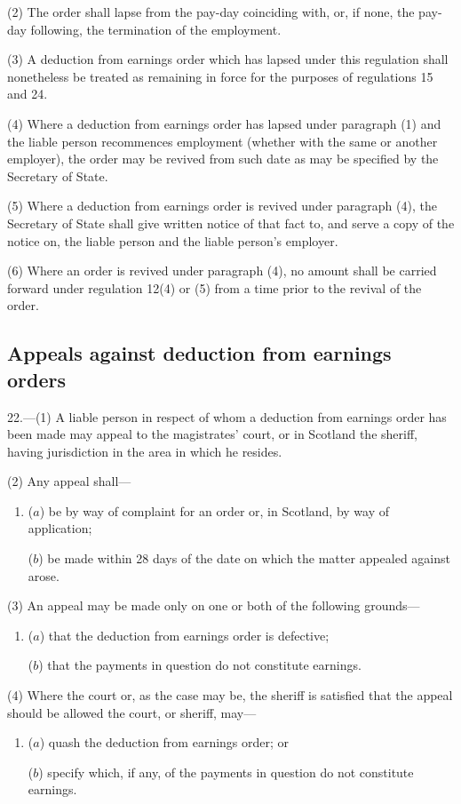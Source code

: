 \documentclass[a4paper]{article}
\begin{document}
(2) The order shall lapse from the pay-day coinciding with, or, if none, the pay-day following, the termination of the employment.

(3) A deduction from earnings order which has lapsed under this regulation shall nonetheless be treated as remaining in force for the purposes of regulations 15 and 24.

(4) Where a deduction from earnings order has lapsed under paragraph (1) and the liable person recommences employment (whether with the same or another employer), the order may be revived from such date as may be specified by the Secretary of State.

(5) Where a deduction from earnings order is revived under paragraph (4), the Secretary of State shall give written notice of that fact to, and serve a copy of the notice on, the liable person and the liable person’s employer.

(6) Where an order is revived under paragraph (4), no amount shall be carried forward under regulation 12(4) or (5) from a time prior to the revival of the order.

\subsection[22. Appeals against deduction from earnings orders]{Appeals against deduction from earnings orders}

22.—(1) A liable person in respect of whom a deduction from earnings order has been made may appeal to the magistrates' court, or in Scotland the sheriff, having jurisdiction in the area in which he resides.

(2) Any appeal shall—
\begin{enumerate}\item[]
($a$) be by way of complaint for an order or, in Scotland, by way of application;

($b$) be made within 28 days of the date on which the matter appealed against arose.
\end{enumerate}

(3) An appeal may be made only on one or both of the following grounds—
\begin{enumerate}\item[]
($a$) that the deduction from earnings order is defective;

($b$) that the payments in question do not constitute earnings.
\end{enumerate}

(4) Where the court or, as the case may be, the sheriff is satisfied that the appeal should be allowed the court, or sheriff, may—
\begin{enumerate}\item[]
($a$) quash the deduction from earnings order; or

($b$) specify which, if any, of the payments in question do not constitute earnings.
\end{enumerate}
\end{document}
